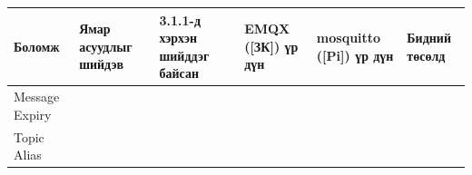 \begingroup\scriptsize\begin{longtable}[]{@{}llllll@{}}
\toprule
\begin{minipage}[b]{0.14\columnwidth}\raggedright
Боломж\strut
\end{minipage} & \begin{minipage}[b]{0.14\columnwidth}\raggedright
Ямар асуудлыг шийдэв\strut
\end{minipage} & \begin{minipage}[b]{0.14\columnwidth}\raggedright
3.1.1-д хэрхэн шийддэг байсан\strut
\end{minipage} & \begin{minipage}[b]{0.14\columnwidth}\raggedright
EMQX ({[}ЗК{]}) үр дүн\strut
\end{minipage} & \begin{minipage}[b]{0.14\columnwidth}\raggedright
mosquitto ({[}Pi{]}) үр дүн\strut
\end{minipage} & \begin{minipage}[b]{0.14\columnwidth}\raggedright
Бидний төсөлд\strut
\end{minipage}\tabularnewline
\midrule
\endhead
\begin{minipage}[t]{0.14\columnwidth}\raggedright
Message Expiry\strut
\end{minipage} & \begin{minipage}[t]{0.14\columnwidth}\raggedright
\strut
\end{minipage} & \begin{minipage}[t]{0.14\columnwidth}\raggedright
\strut
\end{minipage} & \begin{minipage}[t]{0.14\columnwidth}\raggedright
\strut
\end{minipage} & \begin{minipage}[t]{0.14\columnwidth}\raggedright
\strut
\end{minipage} & \begin{minipage}[t]{0.14\columnwidth}\raggedright
\strut
\end{minipage}\tabularnewline
\begin{minipage}[t]{0.14\columnwidth}\raggedright
Topic Alias\strut
\end{minipage} & \begin{minipage}[t]{0.14\columnwidth}\raggedright
\strut
\end{minipage} & \begin{minipage}[t]{0.14\columnwidth}\raggedright
\strut
\end{minipage} & \begin{minipage}[t]{0.14\columnwidth}\raggedright

\end{minipage}
\end{longtable}
